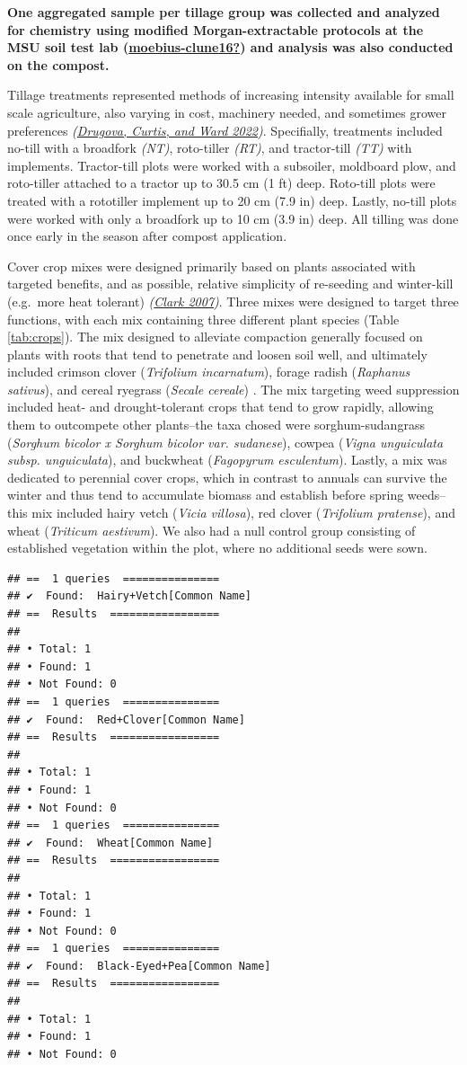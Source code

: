 \documentclass[
  12pt,
]{article}
\begin{document}
\textbf{One aggregated sample per tillage group was collected and analyzed for chemistry using modified Morgan-extractable protocols at the MSU soil test lab (\protect\hyperlink{ref-moebius-clune16}{\textbf{moebius-clune16?}}) and analysis was also conducted on the compost.}

Tillage treatments represented methods of increasing intensity available for small scale agriculture, also varying in cost, machinery needed, and sometimes grower preferences \emph{(\protect\hyperlink{ref-drugova22}{Drugova, Curtis, and Ward 2022})}.
Specifially, treatments included no-till with a broadfork \emph{(NT)}, roto-tiller \emph{(RT)}, and tractor-till \emph{(TT)} with implements.
Tractor-till plots were worked with a subsoiler, moldboard plow, and roto-tiller attached to a tractor up to 30.5 cm (1 ft) deep.
Roto-till plots were treated with a rototiller implement up to 20 cm (7.9 in) deep.
Lastly, no-till plots were worked with only a broadfork up to 10 cm (3.9 in) deep.
All tilling was done once early in the season after compost application.

Cover crop mixes were designed primarily based on plants associated with targeted benefits, and as possible, relative simplicity of re-seeding and winter-kill (e.g.~more heat tolerant) \emph{(\protect\hyperlink{ref-clark07}{Clark 2007})}.
Three mixes were designed to target three functions, with each mix containing three different plant species (Table \ref{tab:crops}).
The mix designed to alleviate compaction generally focused on plants with roots that tend to penetrate and loosen soil well, and ultimately included
crimson clover (\emph{Trifolium incarnatum}),
forage radish (\emph{Raphanus sativus}), and
cereal ryegrass (\emph{Secale cereale})
.
The mix targeting weed suppression included heat- and drought-tolerant crops that tend to grow rapidly, allowing them to outcompete other plants--the taxa chosed were
sorghum-sudangrass (\emph{Sorghum bicolor x Sorghum bicolor var. sudanese}),
cowpea (\emph{Vigna unguiculata subsp. unguiculata}), and
buckwheat (\emph{Fagopyrum esculentum}).
Lastly, a mix was dedicated to perennial cover crops, which in contrast to annuals can survive the winter and thus tend to accumulate biomass and establish before spring weeds--this mix included
hairy vetch (\emph{Vicia villosa}),
red clover (\emph{Trifolium pratense}), and
wheat (\emph{Triticum aestivum}).
We also had a null control group consisting of established vegetation within the plot, where no additional seeds were sown.

\begin{verbatim}
## ==  1 queries  ===============
## ✔  Found:  Hairy+Vetch[Common Name]
## ==  Results  =================
## 
## • Total: 1 
## • Found: 1 
## • Not Found: 0
## ==  1 queries  ===============
## ✔  Found:  Red+Clover[Common Name]
## ==  Results  =================
## 
## • Total: 1 
## • Found: 1 
## • Not Found: 0
## ==  1 queries  ===============
## ✔  Found:  Wheat[Common Name]
## ==  Results  =================
## 
## • Total: 1 
## • Found: 1 
## • Not Found: 0
## ==  1 queries  ===============
## ✔  Found:  Black-Eyed+Pea[Common Name]
## ==  Results  =================
## 
## • Total: 1 
## • Found: 1 
## • Not Found: 0
\end{verbatim}
\end{document}
